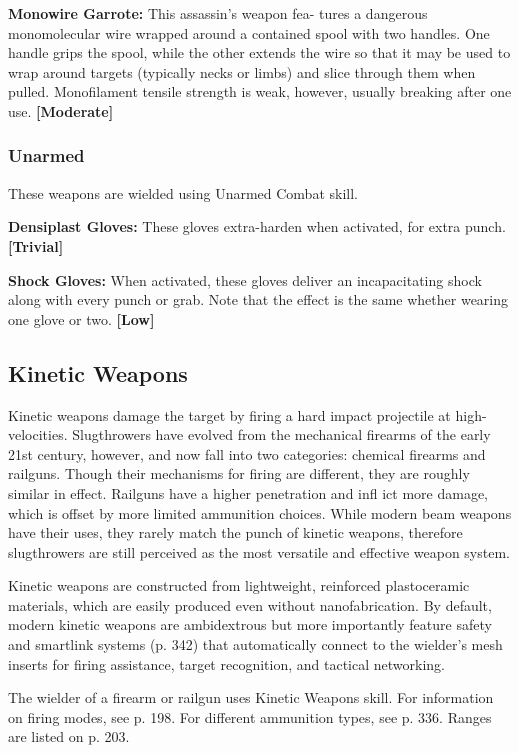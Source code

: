 \textbf{Monowire Garrote:} This assassin's weapon fea-
tures a dangerous monomolecular wire wrapped 
around a contained spool with two handles. One 
handle grips the spool, while the other extends the 
wire so that it may be used to wrap around targets 
(typically necks or limbs) and slice through them 
when pulled. Monofilament tensile strength is weak, 
however, usually breaking after one use. \textbf{[Moderate]}

\subsubsection{Unarmed}

These weapons are wielded using Unarmed Combat skill.

\textbf{Densiplast Gloves:} These gloves extra-harden when 
activated, for extra punch. \textbf{[Trivial]}

\textbf{Shock Gloves:} When activated, these gloves deliver 
an incapacitating shock along with every punch or 
grab. Note that the effect is the same whether wearing 
one glove or two. \textbf{[Low]}

\subsection{Kinetic Weapons}

Kinetic weapons damage the target by firing a hard 
impact projectile at high-velocities. Slugthrowers 
have evolved from the mechanical firearms of the 
early 21st century, however, and now fall into two 
categories: chemical firearms and railguns. Though 
their mechanisms for firing are different, they are 
roughly similar in effect. Railguns have a higher 
penetration and infl ict more damage, which is offset 
by more limited ammunition choices. While modern 
beam weapons have their uses, they rarely match the 
punch of kinetic weapons, therefore slugthrowers 
are still perceived as the most versatile and effective 
weapon system.

Kinetic weapons are constructed from lightweight, 
reinforced plastoceramic materials, which are easily 
produced even without nanofabrication. By default, 
modern kinetic weapons are ambidextrous but more 
importantly feature safety and smartlink systems (p. 
342) that automatically connect to the wielder's mesh 
inserts for firing assistance, target recognition, and 
tactical networking.

The wielder of a firearm or railgun uses Kinetic 
Weapons skill. For information on firing modes, see 
p. 198. For different ammunition types, see p. 336. 
Ranges are listed on p. 203.

